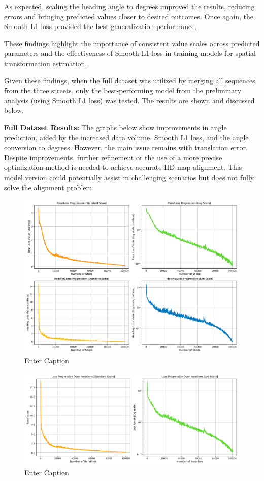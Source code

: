 As expected, scaling the heading angle to degrees improved the results, reducing errors and bringing predicted values closer to desired outcomes. Once again, the Smooth L1 loss provided the best generalization performance.

These findings highlight the importance of consistent value scales across predicted parameters and the effectiveness of Smooth L1 loss in training models for spatial transformation estimation.

Given these findings, when the full dataset was utilized by merging all sequences from the three streets, only the best-performing model from the preliminary analysis (using Smooth L1 loss) was tested. The results are shown and discussed below.

\textbf{Full Dataset Results:} The graphs below show improvements in angle prediction, aided by the increased data volume, Smooth L1 loss, and the angle conversion to degrees. However, the main issue remains with translation error. Despite improvements, further refinement or the use of a more precise optimization method is needed to achieve accurate HD map alignment. This model version could potentially assist in challenging scenarios but does not fully solve the alignment problem.
\begin{figure}
    \centering
    \includegraphics[width=1\linewidth]{LateX//figs/l1sDEG_pose_heading_loss_comparison.png}
    \caption{Enter Caption}
    \label{fig:enter-label}
\end{figure}

\begin{figure}
    \centering
    \includegraphics[width=1\linewidth]{loss_total_l1sDEG_progression_comparison.png}
    \caption{Enter Caption}
    \label{fig:enter-label}
\end{figure}

